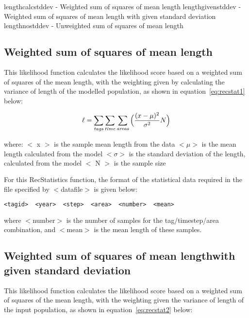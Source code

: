 \documentclass [a4paper, 10pt]{book}
\begin{document}
\bigskip
lengthcalcstddev - Weighted sum of squares of mean length\newline
lengthgivenstddev - Weighted sum of squares of mean length with given standard deviation\newline
lengthnostddev - Unweighted sum of squares of mean length

\subsection{Weighted sum of squares of mean length}
This likelihood function calculates the likelihood score based on a weighted sum of squares of the mean length, with the weighting given by calculating the variance of length of the modelled population, as shown in equation~\ref{eq:recstat1} below:

\begin{equation}\label{eq:recstat1}
\ell = \sum_{\it tags}\sum_{\it time}\sum_{\it areas} \Big(\frac{(x-\mu)^2} {\sigma^2} N\Big)
\end{equation}

where:\newline
$<$ x $>$ is the sample mean length from the data\newline
$<\mu>$ is the mean length calculated from the model\newline
$<\sigma>$ is the standard deviation of the length, calculated from the model\newline
$<$ N $>$ is the sample size

\bigskip
For this RecStatistics function, the format of the statistical data required in the file specified by $<$datafile$>$ is given below:

{\small\begin{verbatim}
<tagid>  <year>  <step>  <area>  <number>  <mean>
\end{verbatim}}

where $<$number$>$ is the number of samples for the tag/timestep/area combination, and $<$mean$>$ is the mean length of these samples.

\subsection{Weighted sum of squares of mean length\newline with given standard deviation}
This likelihood function calculates the likelihood score based on a weighted sum of squares of the mean length, with the weighting given the variance of length of the input population, as shown in  equation~\ref{eq:recstat2} below:
\end{document}
